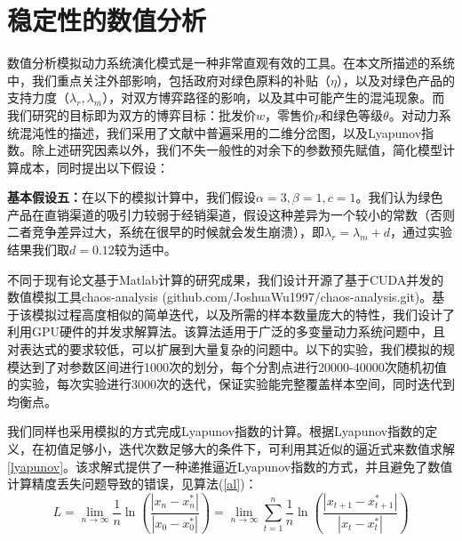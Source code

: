 \documentclass{article}
\begin{document}
\section{稳定性的数值分析}
\par 数值分析模拟动力系统演化模式是一种非常直观有效的工具。在本文所描述的系统中，我们重点关注外部影响，包括政府对绿色原料的补贴（$\eta$），以及对绿色产品的支持力度（$\lambda_r, \lambda_m$），对双方博弈路径的影响，以及其中可能产生的混沌现象。而我们研究的目标即为双方的博弈目标：批发价$w$，零售价$p$和绿色等级$\theta$。对动力系统混沌性的描述，我们采用了文献中普遍采用的二维分岔图，以及Lyapunov指数\cite{2017Tang}\cite{2018Zhang}\cite{2015Zhang}\cite{2018Huang}。除上述研究因素以外，我们不失一般性的对余下的参数预先赋值，简化模型计算成本，同时提出以下假设：
\par \textbf{基本假设五：}在以下的模拟计算中，我们假设$\alpha=3, \beta=1, c=1$。我们认为绿色产品在直销渠道的吸引力较弱于经销渠道，假设这种差异为一个较小的常数（否则二者竞争差异过大，系统在很早的时候就会发生崩溃），即$\lambda_r=\lambda_m+d$，通过实验结果我们取$d=0.12$较为适中。
\par 不同于现有论文基于Matlab计算的研究成果，我们设计开源了基于CUDA并发的数值模拟工具chaos-analysis (github.com/JoshuaWu1997/chaos-analysis.git)。基于该模拟过程高度相似的简单迭代，以及所需的样本数量庞大的特性，我们设计了利用GPU硬件的并发求解算法。该算法适用于广泛的多变量动力系统问题中，且对表达式的要求较低，可以扩展到大量复杂的问题中。以下的实验，我们模拟的规模达到了对参数区间进行1000次的划分，每个分割点进行20000-40000次随机初值的实验，每次实验进行3000次的迭代，保证实验能完整覆盖样本空间，同时迭代到均衡点。
\par 我们同样也采用模拟的方式完成Lyapunov指数的计算。根据Lyapunov指数的定义，在初值足够小，迭代次数足够大的条件下，可利用其近似的逼近式来数值求解\ref{lyapunov}。该求解式提供了一种递推逼近Lyapunov指数的方式，并且避免了数值计算精度丢失问题导致的错误，见算法(\ref{al})：
\begin{equation}\label{lyapunov}
    L=\lim_{n\rightarrow\infty}\frac{1}{n}\ln(\frac{|x_n-x^*_n|}{|x_0-x^*_0|})=\lim_{n\rightarrow\infty}\sum_{t=1}^{n}\frac{1}{n}\ln(\frac{|x_{t+1}-x^*_{t+1}|}{|x_t-x^*_t|})
\end{equation}
\IncMargin{1em}
\end{document}
